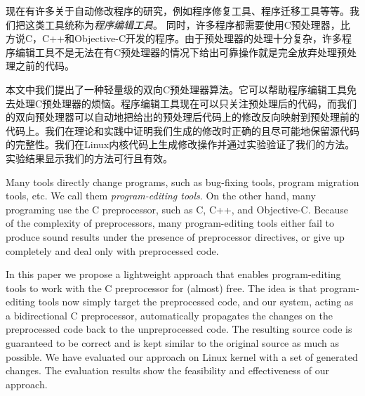 
\begin{cabstract}
现在有许多关于自动修改程序的研究，例如程序修复工具、程序迁移工具等等。我们把这类工具统称为\emph{程序编辑工具}。
同时，许多程序都需要使用C预处理器，比方说C，C++和Objective-C开发的程序。由于预处理器的处理十分复杂，许多程序编辑工具不是无法在有C预处理器的情况下给出可靠操作就是完全放弃处理预处理之前的代码。

本文中我们提出了一种轻量级的双向C预处理器算法。它可以帮助程序编辑工具免去处理C预处理器的烦恼。程序编辑工具现在可以只关注预处理后的代码，而我们的双向预处理器可以自动地把给出的预处理后代码上的修改反向映射到预处理前的代码上。我们在理论和实践中证明我们生成的修改时正确的且尽可能地保留源代码的完整性。我们在Linux内核代码上生成修改操作并通过实验验证了我们的方法。实验结果显示我们的方法可行且有效。
\end{cabstract}

\begin{eabstract}
Many tools directly change programs, such as bug-fixing tools, program migration tools, etc. We call them \emph{program-editing tools}. On the other hand, many programing use the C preprocessor, such as C, C++, and Objective-C. Because of the complexity of preprocessors, many program-editing tools either fail to produce sound results under the presence of preprocessor directives, or give up completely and deal only with preprocessed code.

In this paper we propose a lightweight approach that enables program-editing tools to work with the C preprocessor for (almost) free. The idea is that program-editing tools now simply target the preprocessed code, and our system, acting as a bidirectional C preprocessor, automatically propagates the changes on the preprocessed code back to the unpreprocessed code. The resulting source code is guaranteed to be correct and is kept similar to the original source as much as possible. We have evaluated our approach on Linux kernel with a set of generated changes. The evaluation results show the feasibility and effectiveness of our approach.
\end{eabstract}

